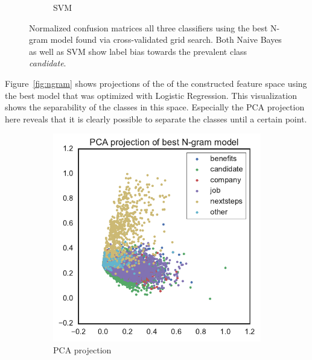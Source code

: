 \begin{figure}[h]
\begin{subfigure}[b]{0.35\textwidth}
        \caption{SVM}
\label{fig:ngram-conf-matrix-svm-normalized}
    \end{subfigure}
    \caption{Normalized confusion matrices all three classifiers using the best N-gram model found via cross-validated grid search. Both Naive Bayes as well as SVM show label bias towards the prevalent class \emph{candidate}.}
\label{fig:ngram-conf-matrix}
\end{figure}

Figure~\ref{fig:ngram} shows projections of the of the constructed feature space using the best model that was optimized with Logistic Regression. This visualization shows the separability of the classes in this space. Especially the PCA projection here reveals that it is clearly possible to separate the classes until a certain point.

\begin{figure}[h]
    \centering
    \begin{subfigure}[b]{0.48\textwidth}
      \includegraphics[width=\textwidth]{img/exp-vector-space/ngram-pca.pdf}
      \caption{PCA projection}
\label{fig:ngram-pca}
    \end{subfigure}
~
    \begin{subfigure}[b]{0.48\textwidth}

\end{subfigure}
\end{figure}
